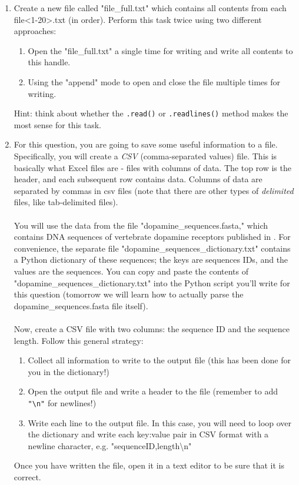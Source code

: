 \documentclass{article}[12pt]
\newcommand{\code}[1]{\texttt{#1}}  %
\begin{document}
\begin{enumerate}[itemsep=5ex]
		\item Create a new file called "file\_full.txt" which contains all contents from each file<1-20>.txt (in order). Perform this task twice using two different approaches:

		\begin{enumerate}[itemsep=2ex]
			\item Open the "file\_full.txt" a single time for writing and write all contents to this handle.
			\item Using the "append" mode to open and close the file multiple times for writing.
		\end{enumerate}
		Hint: think about whether the \code{.read()} or \code{.readlines()} method makes the most sense for this task.
	
	\item For this question, you are going to save some useful information to a file. Specifically, you will create a \emph{CSV} (comma-separated values) file. This is basically what Excel files are - files with columns of data. The top row is the header, and each subsequent row contains data. Columns of data are separated by commas in csv files (note that there are other types of \emph{delimited} files, like tab-delimited files). 
	\\\\ You will use the data from the file "dopamine\_sequences.fasta," which contains DNA sequences of vertebrate dopamine receptors published in \citet{SpielmanKumarWilke2015}. For convenience, the separate file "dopamine\_sequences\_dictionary.txt" contains a Python dictionary of these sequences; the keys are sequences IDs, and the values are the sequences. You can copy and paste the contents of "dopamine\_sequences\_dictionary.txt" into the Python script you'll write for this question (tomorrow we will learn how to actually parse the dopamine\_sequences.fasta file itself).
	\\\\ Now, create a CSV file with two columns: the sequence ID and the sequence length. Follow this general strategy:
		\begin{enumerate}[itemsep=2ex]
			\item Collect all information to write to the output file (this has been done for you in the dictionary!)
			\item Open the output file and write a header to the file (remember to add \code{"\textbackslash n"} for newlines!)
			\item Write each line to the output file. In this case, you will need to loop over the dictionary and write each key:value pair in CSV format with a newline character, e.g. "sequenceID,length\textbackslash n"
		\end{enumerate}
	Once you have written the file, open it in a text editor to be sure that it is correct.
	

\end{enumerate}
\end{document}
